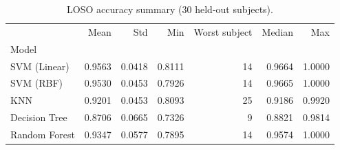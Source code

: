 \begin{table}
\caption{LOSO accuracy summary (30 held-out subjects).}
\label{tab:Ext10_loso_summary}
\begin{tabular}{lrrrrrr}
\toprule
 & Mean & Std & Min & Worst subject & Median & Max \\
Model &  &  &  &  &  &  \\
\midrule
SVM (Linear) & 0.9563 & 0.0418 & 0.8111 & 14 & 0.9664 & 1.0000 \\
SVM (RBF) & 0.9530 & 0.0453 & 0.7926 & 14 & 0.9665 & 1.0000 \\
KNN & 0.9201 & 0.0453 & 0.8093 & 25 & 0.9186 & 0.9920 \\
Decision Tree & 0.8706 & 0.0665 & 0.7326 & 9 & 0.8821 & 0.9814 \\
Random Forest & 0.9347 & 0.0577 & 0.7895 & 14 & 0.9574 & 1.0000 \\
\bottomrule
\end{tabular}
\end{table}
